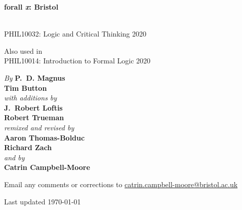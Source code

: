 


\pagestyle{empty}

\vspace*{80pt}



\begin{center}
\fontsize{30pt}{24pt}\sffamily
\selectfont
  \textbf{forall\!
  {\fontsize{37pt}{24pt}\selectfont\rmfamily\textit{x}}: 
  Bristol}
\end{center}

\bigskip \fontsize{12pt}{16pt}\selectfont
{}\\
PHIL10032: Logic and Critical Thinking 2020

\medskip \noindent Also used in\\
PHIL10014: Introduction to Formal Logic 2020 


\vfill\noindent
\fontsize{12pt}{16pt}\selectfont \textit{By } \textbf{P.~D. Magnus}\\
\textbf{Tim Button}\\
\textit{with additions by}\\
\textbf{J.~Robert Loftis}\\
\textbf{Robert Trueman}\\
\textit{remixed and revised by}\\
\textbf{Aaron Thomas-Bolduc}\\ \textbf{Richard Zach}\\
\textit{and by}\\
\textbf{Catrin Campbell-Moore}

\vfill
\noindent Email any comments or corrections to \href{mailto:catrin.campbell-moore@bristol.ac.uk}{catrin.campbell-moore@bristol.ac.uk}

\noindent Last updated \today\par



\newpage


